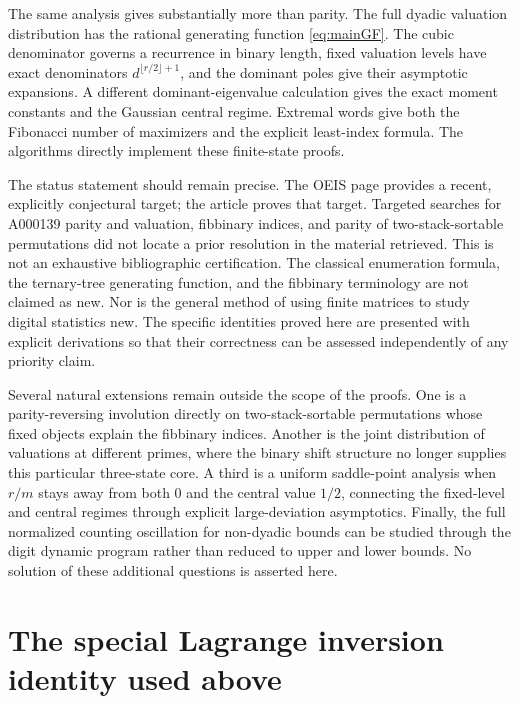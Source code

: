 \documentclass[11pt]{article}
\theoremstyle{definition}\newtheorem{definition}[theorem]{Definition}
\theoremstyle{remark}\newtheorem{remark}[theorem]{Remark}
\begin{document}
The same analysis gives substantially more than parity. The full dyadic
valuation distribution has the rational generating function
\eqref{eq:mainGF}. The cubic denominator governs a recurrence in binary
length, fixed valuation levels have exact denominators
$d^{\lfloor r/2\rfloor+1}$, and the dominant poles give their asymptotic
expansions. A different dominant-eigenvalue calculation gives the exact
moment constants and the Gaussian central regime. Extremal words give
both the Fibonacci number of maximizers and the explicit least-index
formula. The algorithms directly implement these finite-state proofs.

The status statement should remain precise. The OEIS page provides a
recent, explicitly conjectural target; the article proves that target.
Targeted searches for A000139 parity and valuation, fibbinary indices,
and parity of two-stack-sortable permutations did not locate a prior
resolution in the material retrieved. This is not an exhaustive
bibliographic certification. The classical enumeration formula, the
ternary-tree generating function, and the fibbinary terminology are not
claimed as new. Nor is the general method of using finite matrices to
study digital statistics new. The specific identities proved here are
presented with explicit derivations so that their correctness can be
assessed independently of any priority claim.

Several natural extensions remain outside the scope of the proofs.
One is a parity-reversing involution directly on two-stack-sortable
permutations whose fixed objects explain the fibbinary indices. Another
is the joint distribution of valuations at different primes, where the
binary shift structure no longer supplies this particular three-state
core. A third is a uniform saddle-point analysis when $r/m$ stays away
from both $0$ and the central value $1/2$, connecting the fixed-level
and central regimes through explicit large-deviation asymptotics.
Finally, the full normalized counting oscillation for non-dyadic bounds
can be studied through the digit dynamic program rather than reduced
to upper and lower bounds. No solution of these additional questions is
asserted here.

\appendix
\section{The special Lagrange inversion identity used above}\label{sec:lagrange}
\end{document}
